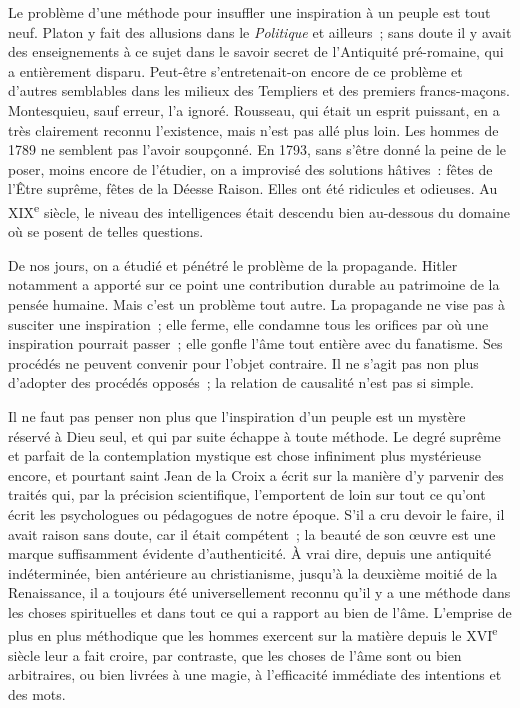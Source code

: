 \documentclass[french,twoside]{book} %
\begin{document}
\noindent \par
Le problème d'une méthode pour insuffler une inspiration à un peuple est tout neuf. Platon y fait des allusions dans le {\itshape Politique} et ailleurs ; sans doute il y avait des enseignements à ce sujet dans le savoir secret de l'Antiquité pré-romaine, qui a entièrement disparu. Peut-être s'entretenait-on encore de ce problème et d'autres semblables dans les milieux des Templiers et des premiers francs-maçons. Montesquieu, sauf erreur, l'a ignoré. Rousseau, qui était un esprit puissant, en a très clairement reconnu l'existence, mais n'est pas allé plus loin. Les hommes de 1789 ne semblent pas l'avoir soupçonné. En 1793, sans s'être donné la peine de le poser, moins encore de l'étudier, on a improvisé des solutions hâtives : fêtes de l'Être suprême, fêtes de la Déesse Raison. Elles ont été ridicules et odieuses. Au XIX\textsuperscript{e} siècle, le niveau des intelligences était descendu bien au-dessous du domaine où se posent de telles questions.\par
De nos jours, on a étudié et pénétré le problème de la propagande. Hitler notamment a apporté sur ce point une contribution durable au patrimoine de la pensée humaine. Mais c'est un problème tout autre. La propagande ne vise pas à susciter une inspiration ; elle ferme, elle condamne tous les orifices par où une inspiration pourrait passer ; elle gonfle l'âme tout entière avec du fanatisme. Ses procédés ne peuvent convenir pour l'objet contraire. Il ne s'agit pas non plus d'adopter des procédés opposés ; la relation de causalité n'est pas si simple.\par
Il ne faut pas penser non plus que l'inspiration d'un peuple est un mystère réservé à Dieu seul, et qui par suite échappe à toute méthode. Le degré suprême et parfait de la contemplation mystique est chose infiniment plus mystérieuse encore, et pourtant saint Jean de la Croix a écrit sur la manière d'y parvenir des traités qui, par la précision scientifique, l'emportent de loin sur tout ce qu'ont écrit les psychologues ou pédagogues de notre époque. S'il a cru devoir le faire, il avait raison sans doute, car il était compétent ; la beauté de son œuvre est une marque suffisamment évidente d'authenticité. À vrai dire, depuis une antiquité indéterminée, bien antérieure au christianisme, jusqu'à la deuxième moitié de la Renaissance, il a toujours été universellement reconnu qu'il y a une méthode dans les choses spirituelles et dans tout ce qui a rapport au bien de l'âme. L'emprise de plus en plus méthodique que les hommes exercent sur la matière depuis le XVI\textsuperscript{e} siècle leur a fait croire, par contraste, que les choses de l'âme sont ou bien arbitraires, ou bien livrées à une magie, à l'efficacité immédiate des intentions et des mots.\par
\end{document}
